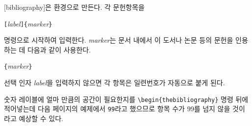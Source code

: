 [bibliography]은  환경으로 만든다.
각 문헌항목을
\begin{lscommand}
\verb|[|\emph{label}\verb|]{|\emph{marker}\verb|}|
\end{lscommand}
\noindent 명령으로 시작하여 입력한다.
\emph{marker}는 문서 내에서 이 도서나 논문 등의 문헌을 인용하는 데 다음과 같이
사용한다.
\begin{lscommand}
\verb|{|\emph{marker}\verb|}|
\end{lscommand}
\noindent 선택 인자 \emph{label}을 입력하지 않으면 각 항목은 일련번호가 자동으로 붙게 된다.

숫자 레이블에 얼마 만큼의 
  공간이 필요한지를
\verb|\begin{thebibliography}| 명령 뒤에 적어넣는데 다음 페이지의 예제에서 \verb|99|라고 했으므로 항목 수가 99를 넘지 않을 것이라고 예상할 수 있다.

